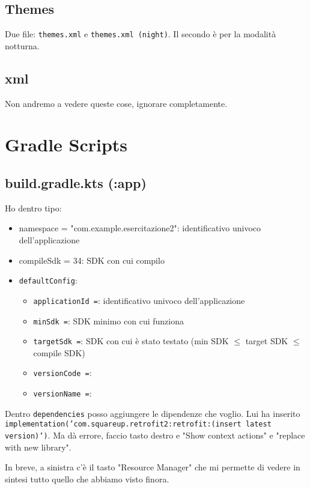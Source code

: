 \subsection{Themes}
\par Due file: \texttt{themes.xml} e \texttt{themes.xml (night)}. Il secondo è per la modalità notturna.

\subsection{xml}
\par Non andremo a vedere queste cose, ignorare completamente.

\section{Gradle Scripts}
\subsection{build.gradle.kts (:app)}
\par Ho dentro tipo:
\begin{itemize}
    \item namespace = "com.example.esercitazione2": identificativo univoco dell'applicazione
    \item compileSdk = 34: SDK con cui compilo
    \item \texttt{defaultConfig}: 
    \begin{itemize}
        \item \texttt{applicationId =}: identificativo univoco dell'applicazione
        \item \texttt{minSdk =}: SDK minimo con cui funziona
        \item \texttt{targetSdk =}: SDK con cui è stato testato (min SDK $\leq$ target SDK $\leq$ compile SDK)
        \item \texttt{versionCode =}: 
        \item \texttt{versionName =}:
    \end{itemize}
\end{itemize}
\par Dentro \texttt{dependencies} posso aggiungere le dipendenze che voglio. Lui ha inserito \texttt{implementation('com.squareup.retrofit2:retrofit:(insert latest version)')}. Ma dà errore, faccio tasto destro e "Show context actions" e "replace with new library".
\par In breve, a sinistra c'è il tasto "Resource Manager" che mi permette di vedere in sintesi tutto quello che abbiamo visto finora.

